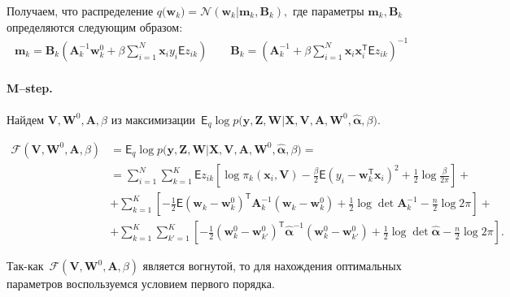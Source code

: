 \documentclass[12pt, twoside]{article}
\numberwithin{equation}{section}
\begin{document}
Получаем, что распределение $q\bigr(\mathbf{w}_{k}\bigr) = \mathcal{N}\left(\mathbf{w}_{k}| \mathbf{m}_{k}, \mathbf{B}_k\right),$ где параметры $\mathbf{m}_k, \mathbf{B}_k$ определяются следующим образом:
\begin{equation}
\label{eq:em:6}
\begin{aligned}
\mathbf{m}_{k} = \mathbf{B}_{k}\left(\mathbf{A}_{k}^{-1}\mathbf{w}_{k}^{0}+\beta\sum_{i=1}^{N}\mathbf{x}_{i}y_{i}\mathsf{E}z_{ik}\right) \qquad \mathbf{B}_{k} = \left(\mathbf{A}_{k}^{-1}+\beta\sum_{i=1}^{N}\mathbf{x}_{i}\mathbf{x}_{i}^{\mathsf{T}}\mathsf{E}z_{ik}\right)^{-1} 
\end{aligned}
\end{equation}

\paragraph{M--step.} Найдем $\mathbf{V}, \mathbf{W}^0, \textbf{A},  \beta$ из максимизации~$\mathsf{E}_{q}\log p\bigr(\mathbf{y}, \mathbf{Z}, \mathbf{W}|\mathbf{X}, \mathbf{V}, \textbf{A}, \textbf{W}^{0}, \hat{\bm{\alpha}}, \beta\bigr)$.

\begin{equation}
\label{eq:em:7}
\begin{aligned}
\mathcal{F}\left(\textbf{V}, \textbf{W}^{0}, \textbf{A}, \beta\right) &= \mathsf{E}_{q}\log p\bigr(\mathbf{y}, \mathbf{Z}, \mathbf{W}|\mathbf{X}, \mathbf{V}, \textbf{A}, \textbf{W}^{0}, \hat{\bm{\alpha}}, \beta\bigr) =  \\
&= \sum_{i=1}^{N}\sum_{k=1}^{K}\mathsf{E}z_{ik}\left[\log\pi_k\left(\textbf{x}_i, \textbf{V}\right) - \frac{\beta}{2}\mathsf{E}\left(y_{i} - \textbf{w}_{k}^{\mathsf{T}}\textbf{x}_{i}\right)^{2} + \frac{1}{2}\log\frac{\beta}{2\pi}\right] +\\
&+ \sum_{k=1}^{K}\left[-\frac{1}{2}\mathsf{E}\left(\textbf{w}_{k} - \textbf{w}_{k}^{0}\right)^{\mathsf{T}}\textbf{A}_{k}^{-1}\left(\textbf{w}_{k} - \textbf{w}_{k}^{0}\right) + \frac{1}{2}\log\det\textbf{A}^{-1}_{k} - \frac{n}{2}\log2\pi\right] +\\
&+ \sum_{k=1}^{K}\sum_{k'=1}^{K}\left[-\frac{1}{2}\left(\textbf{w}_{k}^{0}-\textbf{w}_{k'}^{0}\right)^{\mathsf{T}}\hat{\bm{\alpha}}^{-1}\left(\textbf{w}_{k}^{0}-\textbf{w}_{k'}^{0}\right) +\frac{1}{2}\log\det\hat{\bm{\alpha}} -\frac{n}{2}\log{2\pi}\right].
\end{aligned}
\end{equation}

Так-как~$\mathcal{F}\left(\textbf{V}, \textbf{W}^{0}, \textbf{A}, \beta\right)$ является вогнутой, то для нахождения оптимальных параметров воспользуемся условием первого порядка.
\end{document}

